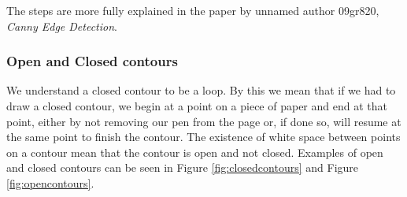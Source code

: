 \documentclass[11pt]{article}
\begin{document}
The steps are more fully explained in the paper by unnamed author 09gr820, 
\textit{Canny Edge Detection}\cite{09gr820}.

\subsubsection{Open and Closed contours}
We understand a closed contour to be a loop. By this we mean that if we had
to draw a closed contour, we begin at a point on a piece of paper and end at that
point, either by not removing our pen from the page or, if done so, will resume
at the same point to finish the contour. The existence of white space between
points on a contour mean that the contour is open and not closed. Examples
of open and closed contours can be seen in Figure \ref{fig:closedcontours} and 
Figure \ref{fig:opencontours}.
\\
\end{document}
